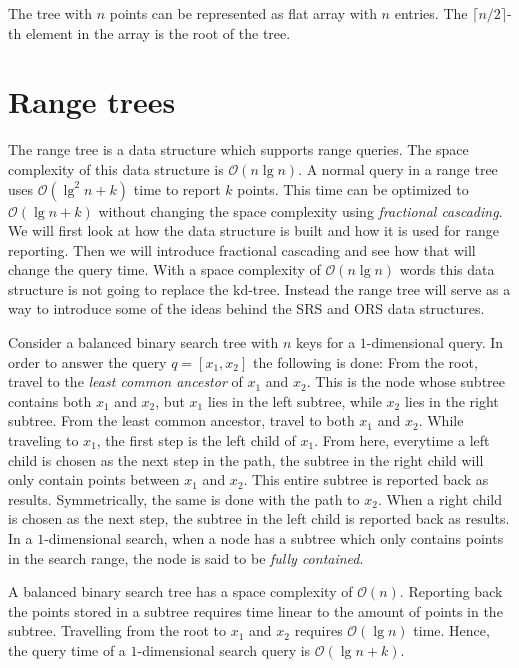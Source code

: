 The tree with $n$ points can be represented as flat array with $n$ entries. The $\lceil n/2 \rceil$-th element in the array is the root of the tree. 

\section{Range trees}
\label{sect:rangetrees}

The range tree is a data structure which supports range queries. The space complexity of this data structure is $\mathcal{O}(n\lg n)$. A normal query in a range tree uses $\mathcal{O}(\lg^2 n + k)$ time to report $k$ points. This time can be optimized to $\mathcal{O}(\lg n + k)$ without changing the space complexity using \emph{fractional cascading}. We will first look at how the data structure is built and how it is used for range reporting. Then we will introduce fractional cascading and see how that will change the query time. With a space complexity of $\mathcal{O}(n \lg n)$ words this data structure is not going to replace the kd-tree. Instead the range tree will serve as a way to introduce some of the ideas behind the SRS and ORS data structures. 

Consider a balanced binary search tree with $n$ keys for a $1$-dimensional query. In order to answer the query $q = [x_1, x_2]$ the following is done: From the root, travel to the \emph{least common ancestor} of $x_1$ and $x_2$. This is the node whose subtree contains both $x_1$ and $x_2$, but $x_1$ lies in the left subtree, while $x_2$ lies in the right subtree. From the least common ancestor, travel to both $x_1$ and $x_2$. While traveling to $x_1$, the first step is the left child of $x_1$. From here, everytime a left child is chosen as the next step in the path, the subtree in the right child will only contain points between $x_1$ and $x_2$. This entire subtree is reported back as results. Symmetrically, the same is done with the path to $x_2$. When a right child is chosen as the next step, the subtree in the left child is reported back as results. In a $1$-dimensional search, when a node has a subtree which only contains points in the search range, the node is said to be \emph{fully contained}.

A balanced binary search tree has a space complexity of $\mathcal{O}(n)$. Reporting back the points stored in a subtree requires time linear to the amount of points in the subtree. Travelling from the root to $x_1$ and $x_2$ requires $\mathcal{O}(\lg n)$ time. Hence, the query time of a $1$-dimensional search query is $\mathcal{O}(\lg n + k)$.

